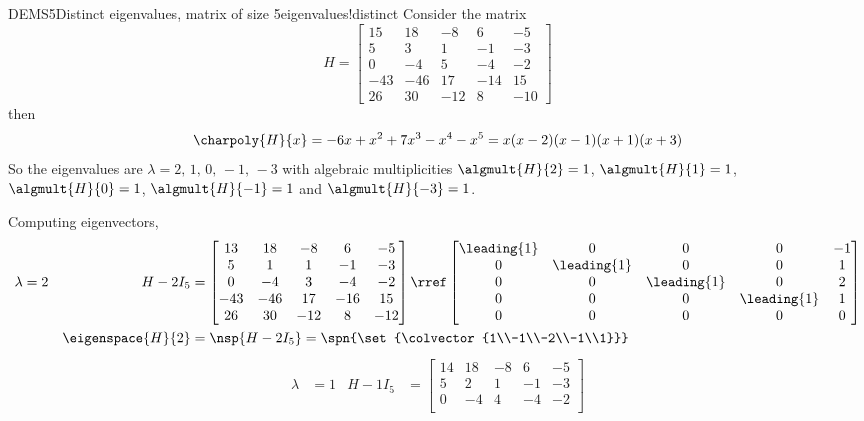 \begin{example}{DEMS5}{Distinct eigenvalues, matrix of size 5}{eigenvalues!distinct}
Consider the matrix
%
\begin{equation*}
H=
\begin{bmatrix}
15 & 18 & -8 & 6 & -5\\
5 & 3 & 1 & -1 & -3\\
0 & -4 & 5 & -4 & -2\\
-43 & -46 & 17 & -14 & 15\\
26 & 30 & -12 & 8 & -10
\end{bmatrix}
\end{equation*}
%
then
%
\begin{equation*}
\charpoly{H}{x}=-6x+x^2+7x^3-x^4-x^5=x(x-2)(x-1)(x+1)(x+3)
\end{equation*}
%
So the eigenvalues are $\lambda=2,\,1,\,0,\,-1,\,-3$ with algebraic multiplicities $\algmult{H}{2}=1$,  $\algmult{H}{1}=1$,  $\algmult{H}{0}=1$,  $\algmult{H}{-1}=1$ and $\algmult{H}{-3}=1$.\par
%
Computing eigenvectors,
%
\begin{align*}
\lambda&=2&H-2I_5&=
\begin{bmatrix}
13 & 18 & -8 & 6 & -5\\
5 & 1 & 1 & -1 & -3\\
0 & -4 & 3 & -4 & -2\\
-43 & -46 & 17 & -16 & 15\\
26 & 30 & -12 & 8 & -12
\end{bmatrix}
\rref
\begin{bmatrix}
\leading{1} & 0 & 0 & 0 & -1\\
0 & \leading{1} & 0 & 0 & 1\\
0 & 0 & \leading{1} & 0 & 2\\
0 & 0 & 0 & \leading{1} & 1\\
0 & 0 & 0 & 0 & 0
\end{bmatrix}\\
&&\eigenspace{H}{2}&=\nsp{H-2I_5}
=\spn{\set{\colvector{1\\-1\\-2\\-1\\1}}}
\end{align*}
%
\begin{align*}
\lambda&=1&H-1I_5&=
\begin{bmatrix}
14 & 18 & -8 & 6 & -5\\
5 & 2 & 1 & -1 & -3\\
0 & -4 & 4 & -4 & -2\\

\end{bmatrix}
\end{align*}
\end{example}
